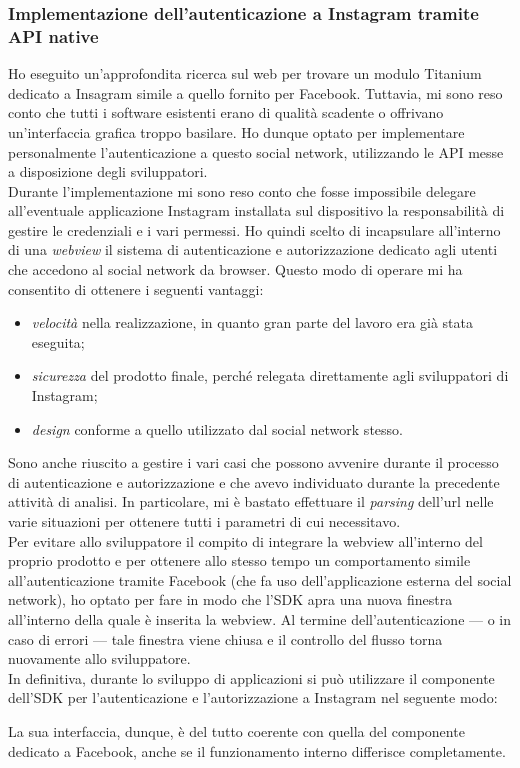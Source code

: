 			\subsubsection{Implementazione dell'autenticazione a Instagram tramite API native}
				Ho eseguito un'approfondita ricerca sul web per trovare un modulo Titanium dedicato a Insagram simile a quello
				fornito per Facebook. Tuttavia, mi sono reso conto che tutti i software esistenti erano di qualità scadente o
				offrivano un'interfaccia grafica troppo basilare. Ho dunque optato per implementare personalmente l'autenticazione
				a questo social network, utilizzando le API messe a disposizione degli sviluppatori.\\
				Durante l'implementazione mi sono reso conto che fosse impossibile delegare all'eventuale applicazione Instagram
				installata sul dispositivo la responsabilità di gestire le credenziali e i vari permessi. Ho quindi scelto di
				incapsulare all'interno di una \emph{webview} il sistema di autenticazione e autorizzazione dedicato agli utenti che
				accedono al social network da browser. Questo modo di operare mi ha consentito di ottenere i seguenti vantaggi:
				\begin{itemize}
					\item \emph{velocità} nella realizzazione, in quanto gran parte del lavoro era già stata eseguita;
					\item \emph{sicurezza} del prodotto finale, perché relegata direttamente agli sviluppatori di Instagram;
					\item \emph{design} conforme a quello utilizzato dal social network stesso.
				\end{itemize}
				Sono anche riuscito a gestire i vari casi che possono avvenire durante il processo di autenticazione e autorizzazione
				e che avevo individuato durante la precedente attività di analisi. In particolare, mi è bastato effettuare il
				\emph{parsing} dell'url nelle varie situazioni per ottenere tutti i parametri di cui necessitavo.\\
				Per evitare allo sviluppatore il compito di integrare la webview all'interno del proprio prodotto e per ottenere allo
				stesso tempo un comportamento simile all'autenticazione tramite Facebook (che fa uso dell'applicazione esterna del
				social network), ho optato per fare in modo che l'SDK apra una nuova finestra all'interno della quale è inserita la
				webview. Al termine dell'autenticazione — o in caso di errori — tale finestra viene chiusa e il controllo del flusso
				torna nuovamente allo sviluppatore.\\
				In definitiva, durante lo sviluppo di applicazioni si può utilizzare il componente dell'SDK per l'autenticazione e
				l'autorizzazione a Instagram nel seguente modo:
				
				La sua interfaccia, dunque, è del tutto coerente con quella del componente dedicato a Facebook, anche se il
				funzionamento interno differisce completamente.
